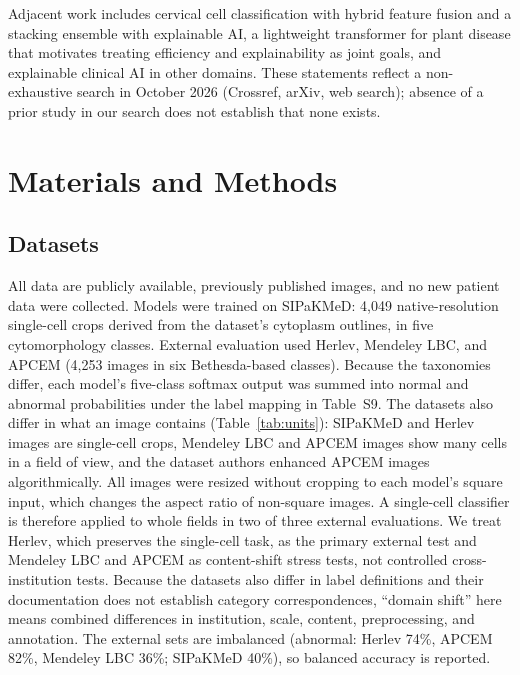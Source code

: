 \documentclass[12pt,letterpaper]{article}
\begin{document}
Adjacent work includes cervical cell classification with hybrid feature fusion\cite{rahaman2021} and a stacking ensemble with explainable AI,\cite{mohiuddin2025} a lightweight transformer for plant disease\cite{rahman2026maizeformerx} that motivates treating efficiency and explainability as joint goals, and explainable clinical AI in other domains.\cite{gony2026retinal,ahmed2026postsurgical} These statements reflect a non-exhaustive search in October 2026 (Crossref, arXiv, web search); absence of a prior study in our search does not establish that none exists.

\section{Materials and Methods}
\label{sec:methods}

\subsection{Datasets}
\label{sec:datasets}
All data are publicly available, previously published images, and no new patient data were collected. Models were trained on SIPaKMeD\cite{plissiti2018sipakmed}: 4,049 native-resolution single-cell crops derived from the dataset's cytoplasm outlines, in five cytomorphology classes. External evaluation used Herlev,\cite{jantzen2005herlev} Mendeley LBC,\cite{hussain2020mendeley} and APCEM\cite{aswini2026apcem} (4,253 images in six Bethesda-based classes). Because the taxonomies differ, each model's five-class softmax output was summed into normal and abnormal probabilities under the label mapping in Table~S9. The datasets also differ in what an image contains (Table~\ref{tab:units}): SIPaKMeD and Herlev images are single-cell crops, Mendeley LBC and APCEM images show many cells in a field of view, and the dataset authors enhanced APCEM images algorithmically. All images were resized without cropping to each model's square input, which changes the aspect ratio of non-square images. A single-cell classifier is therefore applied to whole fields in two of three external evaluations. We treat Herlev, which preserves the single-cell task, as the primary external test and Mendeley LBC and APCEM as content-shift stress tests, not controlled cross-institution tests. Because the datasets also differ in label definitions and their documentation does not establish category correspondences, ``domain shift'' here means combined differences in institution, scale, content, preprocessing, and annotation. The external sets are imbalanced (abnormal: Herlev 74\%, APCEM 82\%, Mendeley LBC 36\%; SIPaKMeD 40\%), so balanced accuracy is reported.
\end{document}
